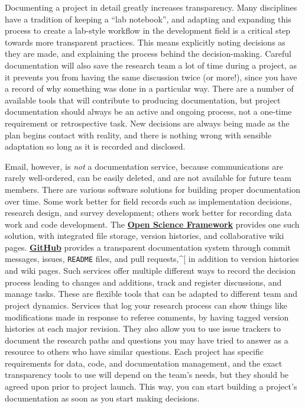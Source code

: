 \documentclass[]{tufte-book}
\begin{document}
Documenting a project in detail greatly increases transparency. Many
disciplines have a tradition of keeping a ``lab notebook'', and adapting
and expanding this process to create a lab-style workflow in the
development field is a critical step towards more transparent practices.
This means explicitly noting decisions as they are made, and explaining
the process behind the decision-making. Careful documentation will also
save the research team a lot of time during a project, as it prevents
you from having the same discussion twice (or more!), since you have a
record of why something was done in a particular way. There are a number
of available tools that will contribute to producing
documentation, but project documentation
should always be an active and ongoing process, not a one-time
requirement or retrospective task. New decisions are always being made
as the plan begins contact with reality, and there is nothing wrong with
sensible adaptation so long as it is recorded and disclosed.

Email, however, is \emph{not} a documentation service, because
communications are rarely well-ordered, can be easily
deleted, and are not available for future team members. There are
various software solutions for building proper documentation over time.
Some work better for field records such as implementation decisions,
research design, and survey development; others work better for
recording data work and code development. The
\href{https://osf.io}{\textbf{Open Science Framework}} provides one such
solution, with integrated file storage,
version histories, and collaborative wiki pages.
\href{https://github.com}{\textbf{GitHub}} provides a transparent
documentation system through commit messages, issues, \texttt{README}
files, and pull requests,\^{}{[}
\href{https://dimewiki.worldbank.org/Getting_started_with_GitHub}{}
in addition to version histories and wiki pages.
Such services offer multiple different ways to record the decision
process leading to changes and additions, track and register
discussions, and manage tasks. These are flexible tools that can be
adapted to different team and project dynamics. Services that log your
research process can show things like modifications made in response to
referee comments, by having tagged version histories at each major
revision. They also allow you to use issue trackers to document the
research paths and questions you may have tried to answer as a resource
to others who have similar questions. Each project has specific
requirements for data, code, and documentation management, and the exact
transparency tools to use will depend on the team's needs, but they
should be agreed upon prior to project launch. This way, you can start
building a project's documentation as soon as you start making
decisions.
\end{document}
